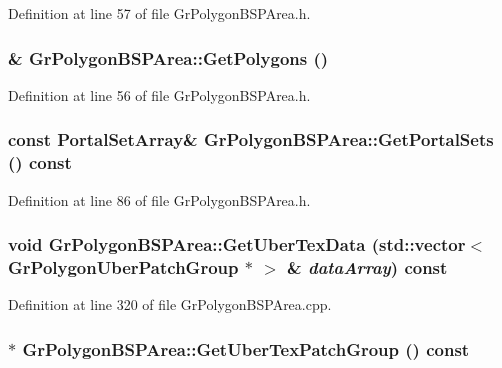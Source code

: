 Definition at line 57 of file GrPolygonBSPArea.h.\hypertarget{class_gr_polygon_b_s_p_area_63247847ab821f68c3c8d6b166ebc419}{
\subsubsection[{GetPolygons}]{\& GrPolygonBSPArea::GetPolygons ()}}
\label{class_gr_polygon_b_s_p_area_63247847ab821f68c3c8d6b166ebc419}




Definition at line 56 of file GrPolygonBSPArea.h.\hypertarget{class_gr_polygon_b_s_p_area_925ba1cab922c0cc8985f656f49e22b1}{
\subsubsection[{GetPortalSets}]{\setlength{\rightskip}{0pt plus 5cm}const {\bf PortalSetArray}\& GrPolygonBSPArea::GetPortalSets () const}}
\label{class_gr_polygon_b_s_p_area_925ba1cab922c0cc8985f656f49e22b1}




Definition at line 86 of file GrPolygonBSPArea.h.\hypertarget{class_gr_polygon_b_s_p_area_6985c4d6183a19c0bc0df57f8aa2c8fb}{
\subsubsection[{GetUberTexData}]{\setlength{\rightskip}{0pt plus 5cm}void GrPolygonBSPArea::GetUberTexData (std::vector$<$ {\bf GrPolygonUberPatchGroup} $\ast$ $>$ \& {\em dataArray}) const}}
\label{class_gr_polygon_b_s_p_area_6985c4d6183a19c0bc0df57f8aa2c8fb}




Definition at line 320 of file GrPolygonBSPArea.cpp.\hypertarget{class_gr_polygon_b_s_p_area_655bfe84fb8008826d8bda2eb2d6f482}{
\subsubsection[{GetUberTexPatchGroup}]{$\ast$ GrPolygonBSPArea::GetUberTexPatchGroup () const}}
\label{class_gr_polygon_b_s_p_area_655bfe84fb8008826d8bda2eb2d6f482}





